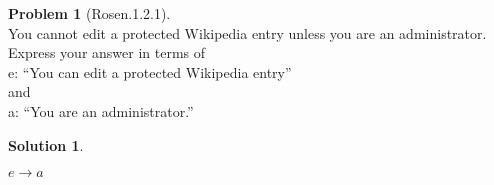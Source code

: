 \documentclass{article}
\theoremstyle{definition}
\newtheorem*{problem}{Problem}
\newtheorem*{solution}{Solution}
\begin{document}
\begin{problem}[Rosen.1.2.1]\ \\
You cannot edit a protected Wikipedia entry unless you
are an administrator. \ \\
Express your answer in terms of \ \\ 
e: “You can edit a protected Wikipedia entry” \ \\
and \ \\
a: “You are an administrator.”\ \\
\begin{compactenum}
\renewcommand{\theenumi}{\alph{enumi}}

\end{compactenum}
\end{problem}

\begin{solution}\ \\
\begin{compactenum}
\renewcommand{\theenumi}{\alph{enumi}}
$e \rightarrow a$
\end{compactenum}
\end{solution}
\end{document}
